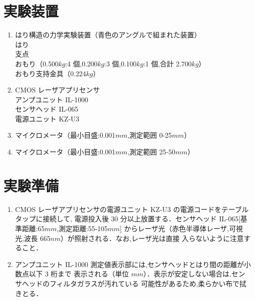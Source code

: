 \documentclass[a4paper,12pt]{jsarticle}
\begin{document}
\section{実験装置}
\begin{enumerate}
  \item はり構造の力学実験装置（青色のアングルで組まれた装置）\\
  はり\\
  支点\\
  おもり（0.500$kg$:4 個,0.200$kg$:3 個,0.100$kg$:1 個,合計 2.700$kg$）\\
  おもり支持金具（0.224$kg$）
  \item CMOS レーザアプリセンサ\\
  アンプユニット IL-1000\\
  センサヘッド IL-065\\
  電源ユニット KZ-U3
  \item マイクロメータ（最小目盛:0.001$mm$,測定範囲 0-25$mm$）
  \item マイクロメータ（最小目盛:0.001$mm$,測定範囲 25-50$mm$）
\end{enumerate}

\section{実験準備}
\begin{enumerate}
  \item CMOS レーザアプリセンサの電源ユニット KZ-U3 の電源コードをテーブルタップに接続して,
  電源投入後 30 分以上放置する．センサヘッド IL-065[基準距離:65$mm$,測定距離:55-105$mm$]
  からレーザ光（赤色半導体レーザ,可視光,波長 665$nm$）が照射される．なお,レーザ光は直接
  入らないように注意すること．
  \item アンプユニット IL-1000 測定値表示部には,センサヘッドとはり間の距離が小数点以下 3 桁まで
  表示される（単位 $mm$）．表示が安定しない場合は,センサヘッドのフィルタガラスが汚れている
  可能性があるため,柔らかい布で拭きとる．
\end{enumerate}
\end{document}
